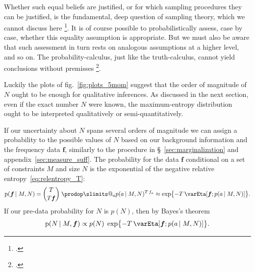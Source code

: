 \documentclass[\ifafour a4paper,12pt,\else a5paper,10pt,\fi%
onecolumn,oneside,article,%
british%
]{memoir}
\makeatletter
\theoremstyle{remark}
\theoremstyle{innote}
\def\prod{\DOTSI\prodop\slimits@}
\newcommand*{\citep}{\footcites}
\newcommand*{\pf}{\mathrm{p}}%
\renewcommand*{\|}{\nonscript\,\vert\nonscript\;\mathopen{}}
\newcommand*{\sect}{\S}%
\newcommand*{\fig}{fig.}%
\newcommand*{\eg}{{e.g.}}
\newcommand*{\yav}{a}
\newcommand*{\yff}{f}
\newcommand*{\yf}{\bm{\yff}}
\newcommand*{\ya}{\yav}%
\newcommand*{\pxx}{p}
\newcommand*{\sh}{\mathrm{\varEta}}
\makeatother
\begin{document}
Whether such equal beliefs are justified, or for which sampling procedures
they can be justified, is the fundamental, deep question of sampling
theory, which we cannot discuss here \citep[see \eg\ the discussions,
reviews, and references
in][]{ericson1969,smith1976,kruskaletal1979c,kruskaletal1980}. It is of
course possible to probabilistically assess, case by case, whether this
equality assumption is appropriate. But we must also be aware that such
assessment in turn rests on analogous assumptions at a higher level, and so
on. The probability-calculus, just like the truth-calculus, cannot yield
conclusions without premisses \citep[p.~182]{johnson1924}.

Luckily the plots of \fig~\ref{fig:plots_5mom} suggest that the order of
magnitude of $N$ ought to be enough for qualitative inferences. As
discussed in the next section, even if the exact number $N$ were known, the
maximum-entropy distribution ought to be interpreted qualitatively or
semi-quantitatively.

If our uncertainty about $N$ spans several orders of magnitude we can
assign a probability to the possible values of $N$ based on our background
information and the frequency data $\yf$, similarly to the procedure in
\sect~\ref{sec:marginalization} and appendix~\ref{sec:measure_suff}. The
probability for the data $\yf$ conditional on a set of constraints $M$ and
size $N$ is the exponential of the negative relative
entropy~\eqref{eq:relentropy_T}:
\begin{equation}
  \label{eq:prob_data_from_N}
  \pf(\yf \| M, N) = \binom{T}{T\yf}\;\prod_{a}\pxx(\ya \| M, N)^{T\,\yff_{a}}
  \approx \exp\bigl\{  -T\,\sh[\yf; \pxx(\ya \| M, N)]\bigr\}.
\end{equation}
If our pre-data probability for $N$ is $p(N)$, then by Bayes's theorem
\begin{equation}
  \label{eq:prob_N_from_data}
  \pf(N \| M, \yf) \propto
  p(N)\;\exp\bigl\{-T\,\sh[\yf; \pxx(\ya \| M, N)]\bigr\}.
\end{equation}
\end{document}
